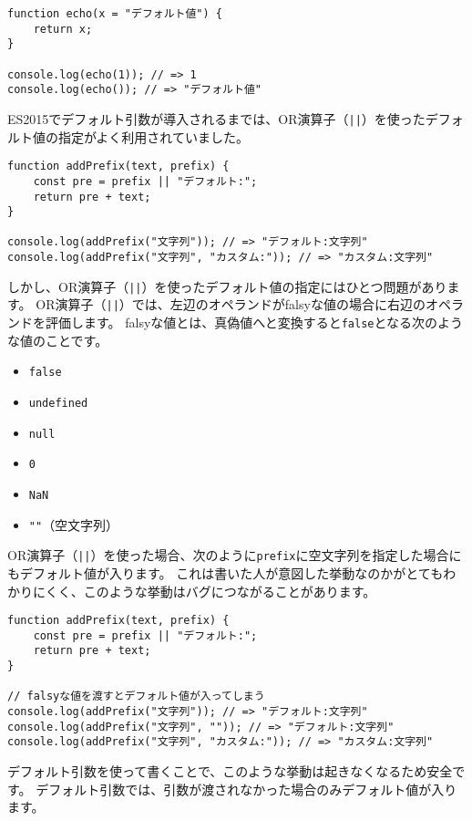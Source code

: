 \begin{lstlisting}
function echo(x = "デフォルト値") {
    return x;
}

console.log(echo(1)); // => 1
console.log(echo()); // => "デフォルト値"
\end{lstlisting}

ES2015でデフォルト引数が導入されるまでは、OR演算子（\texttt{||}）を使ったデフォルト値の指定がよく利用されていました。

\begin{lstlisting}
function addPrefix(text, prefix) {
    const pre = prefix || "デフォルト:";
    return pre + text;
}

console.log(addPrefix("文字列")); // => "デフォルト:文字列"
console.log(addPrefix("文字列", "カスタム:")); // => "カスタム:文字列"
\end{lstlisting}

しかし、OR演算子（\texttt{||}）を使ったデフォルト値の指定にはひとつ問題があります。
OR演算子（\texttt{||}）では、左辺のオペランドがfalsyな値の場合に右辺のオペランドを評価します。
falsyな値とは、真偽値へと変換すると\texttt{false}となる次のような値のことです。

\begin{itemize}
\item
  \texttt{false}
\item
  \texttt{undefined}
\item
  \texttt{null}
\item
  \texttt{0}
\item
  \texttt{NaN}
\item
  \texttt{""}（空文字列）
\end{itemize}

OR演算子（\texttt{||}）を使った場合、次のように\texttt{prefix}に空文字列を指定した場合にもデフォルト値が入ります。
これは書いた人が意図した挙動なのかがとてもわかりにくく、このような挙動はバグにつながることがあります。

\begin{lstlisting}
function addPrefix(text, prefix) {
    const pre = prefix || "デフォルト:";
    return pre + text;
}

// falsyな値を渡すとデフォルト値が入ってしまう
console.log(addPrefix("文字列")); // => "デフォルト:文字列"
console.log(addPrefix("文字列", "")); // => "デフォルト:文字列"
console.log(addPrefix("文字列", "カスタム:")); // => "カスタム:文字列"
\end{lstlisting}

デフォルト引数を使って書くことで、このような挙動は起きなくなるため安全です。
デフォルト引数では、引数が渡されなかった場合のみデフォルト値が入ります。

